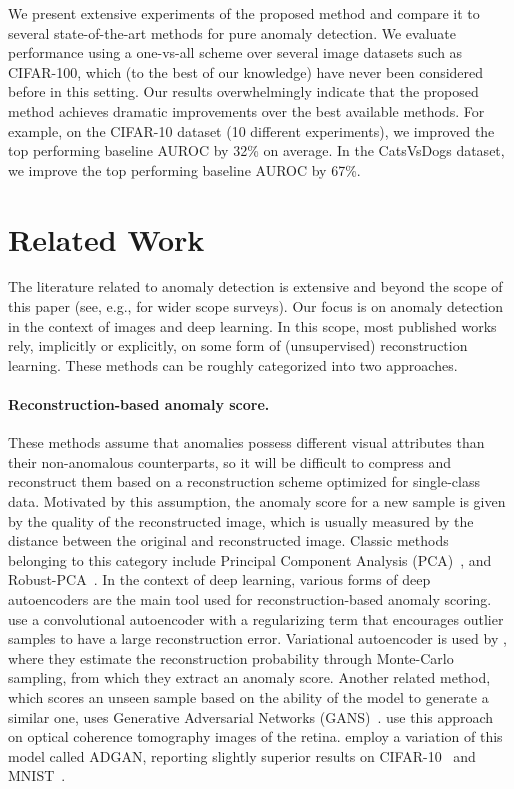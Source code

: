 \documentclass{article}
\begin{document}
	We present extensive experiments of the proposed method and compare it to several 
	state-of-the-art methods for pure anomaly detection. 
	We evaluate performance using a one-vs-all scheme over several image datasets such as CIFAR-100, which (to the best of our knowledge) have never been considered before in this setting. 
	Our results overwhelmingly indicate that the proposed method achieves dramatic improvements over the best available methods. For example, on the CIFAR-10 dataset (10 different experiments), we improved the top performing baseline AUROC by 32\% on average. In the CatsVsDogs dataset, we improve the top performing baseline AUROC by 67\%.
	
	\section{Related Work}
	The literature related to anomaly detection is extensive and beyond the scope of this paper
	(see, e.g.,  \cite{chandola2009anomaly, zimek2012survey} for wider scope surveys).
	Our focus is on 
	anomaly detection in the context of images and deep learning. 
	In this scope, most published works rely, implicitly or explicitly,
	on some form of (unsupervised) reconstruction learning. 
	These methods can be roughly categorized into two approaches.
	
	\paragraph{Reconstruction-based anomaly score.} 
	These methods assume that anomalies possess different visual attributes than their non-anomalous counterparts, so it will be difficult to compress and reconstruct them based on a reconstruction scheme optimized for single-class data. Motivated by this assumption, the anomaly score for a new sample is given by the quality of the reconstructed image, which is usually measured by the  distance between the original and reconstructed image. Classic methods belonging to this category include Principal Component Analysis (PCA)~\cite{jolliffe1986principal}, and Robust-PCA~\cite{candes2011robust}. In the context of deep learning, various forms of deep autoencoders are the main tool used for reconstruction-based anomaly scoring. \citet{xia2015learning} use a convolutional autoencoder with a regularizing term that encourages outlier samples to have a large reconstruction error. Variational autoencoder is used by \citet{an2015variational}, where they estimate the reconstruction probability through Monte-Carlo sampling, from which they extract an anomaly score. Another related method, which scores an unseen sample based on the ability of the model to generate a similar one, uses Generative Adversarial Networks (GANS)~\cite{goodfellow2014generative}. \citet{schlegl2017unsupervised} use this approach on optical coherence tomography images of the retina. \citet{deecke2018anomaly} employ a variation of this model called ADGAN, reporting slightly superior results on CIFAR-10~\cite{krizhevsky2009learning} and MNIST~\cite{lecun2010mnist}.
	
\end{document}
